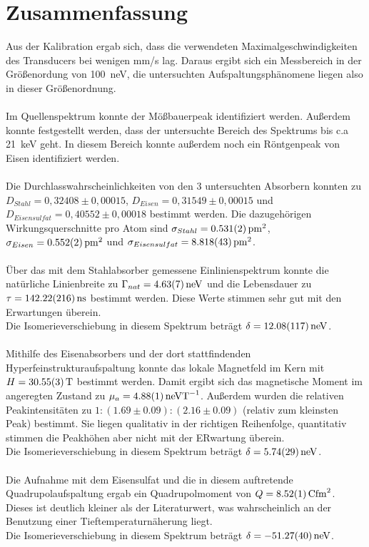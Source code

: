 \documentclass[12pt,a4paper]{article}
\begin{document}
\section{Zusammenfassung}
Aus der Kalibration ergab sich, dass die verwendeten Maximalgeschwindigkeiten des Transducers bei wenigen mm/s lag. Daraus ergibt sich ein Messbereich in der Größenordung von \SI{100}{neV}, die untersuchten Aufspaltungsphänomene liegen also in dieser Größenordnung.\\
\\
Im Quellenspektrum konnte der Mößbauerpeak identifiziert werden. Außerdem konnte festgestellt werden, dass der untersuchte Bereich des Spektrums bis c.a \SI{21}{keV} geht. In diesem Bereich konnte außerdem noch ein Röntgenpeak von Eisen identifiziert werden.\\
\\
Die Durchlasswahrscheinlichkeiten von den 3 untersuchten Absorbern konnten zu $D_{Stahl} = 0,32408 \pm 0,00015$, $D_{Eisen} = 0,31549 \pm 0,00015$ und $D_{Eisensulfat} = 0,40552 \pm 0,00018$ bestimmt werden. Die dazugehörigen Wirkungsquerschnitte pro Atom sind $\sigma_{Stahl} = \SI{0.531\pm 0.002}{pm^2}$, $\sigma_{Eisen} = \SI{0.552\pm 0.002}{pm^2}$ und $\sigma_{Eisensulfat} = \SI{8.818\pm 0.043}{pm^2}$.\\
\\
Über das mit dem Stahlabsorber gemessene Einlinienspektrum konnte die natürliche Linienbreite zu $\Gamma_{nat} = \SI{4.63\pm 0.07}{neV}$ und die Lebensdauer zu $\tau = \SI{142.22\pm2.16}{ns}$ bestimmt werden. Diese Werte stimmen sehr gut mit den Erwartungen überein.\\
Die Isomerieverschiebung in diesem Spektrum beträgt $\delta = \SI{12.08\pm 1.17}{neV}$.\\
\\
Mithilfe des Eisenabsorbers und der dort stattfindenden Hyperfeinstrukturaufspaltung konnte das lokale Magnetfeld im Kern mit $H = \SI{30.55\pm 0.03}{T}$ bestimmt werden. Damit ergibt sich das magnetische Moment im angeregten Zustand zu $\mu_a = \SI{4.88\pm 0.01}{neVT^{-1}}$. Außerdem wurden die relativen Peakintensitäten zu $1:(1.69\pm0.09):(2.16\pm0.09)$ (relativ zum kleinsten Peak) bestimmt. Sie liegen qualitativ in der richtigen Reihenfolge, quantitativ stimmen die Peakhöhen aber nicht mit der ERwartung überein.\\
Die Isomerieverschiebung in diesem Spektrum beträgt $\delta = \SI{5.74\pm 0.29}{neV}$.\\
\\
Die Aufnahme mit dem Eisensulfat und die in diesem auftretende Quadrupolaufspaltung ergab ein Quadrupolmoment von $Q = \SI{8.52\pm 0.01}{Cfm^2}$. Dieses ist deutlich kleiner als der Literaturwert, was wahrscheinlich an der Benutzung einer Tieftemperaturnäherung liegt.\\
Die Isomerieverschiebung in diesem Spektrum beträgt $\delta = \SI{-51.27\pm 0.40}{neV}$.\\
\end{document}
